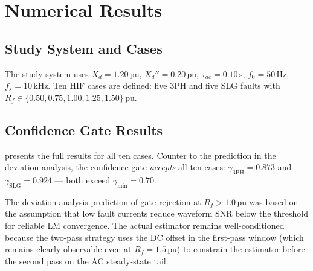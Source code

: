 \documentclass[12pt,a4paper]{article}
\theoremstyle{definition}
\theoremstyle{plain}
\begin{document}
\section{Numerical Results}
\label{sec:results}

\subsection{Study System and Cases}
\label{sec:results:system}

The study system uses $X_d = 1.20\,\text{pu}$, $X_d'' = 0.20\,\text{pu}$,
$\tau_{ac} = 0.10\,\text{s}$, $f_0 = 50\,\text{Hz}$, $f_s = 10\,\text{kHz}$.
Ten HIF cases are defined:
five 3PH and five SLG faults with $R_f \in \{0.50, 0.75, 1.00, 1.25, 1.50\}\,\text{pu}$.

\subsection{Confidence Gate Results}
\label{sec:results:gate}

 presents the full results for all ten cases.
Counter to the prediction in the deviation analysis, the confidence gate
\emph{accepts} all ten cases: $\gamma_{\mathrm{3PH}} = 0.873$ and
$\gamma_{\mathrm{SLG}} = 0.924$ — both exceed $\gamma_{\min} = 0.70$.

The deviation analysis prediction of gate rejection at $R_f > 1.0\,\text{pu}$
was based on the assumption that low fault currents reduce waveform SNR
below the threshold for reliable LM convergence.  The actual estimator remains
well-conditioned because the two-pass strategy uses the DC offset in the
first-pass window (which remains clearly observable even at $R_f = 1.5\,\text{pu}$)
to constrain the estimator before the second pass on the AC steady-state tail.
\end{document}
